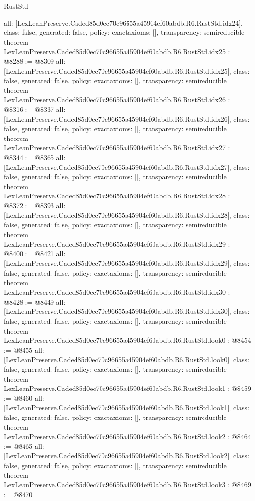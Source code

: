 \begin{lexlean}{RustStd}
\begin{coremodule}
{  all: [LexLeanPreserve.Caded85d0ec70c96655a45904ef60abdb.R6.RustStd.idx24],
  class: false,
  generated: false,
  policy: exact{axioms: []},
  transparency: semireducible
}
theorem LexLeanPreserve.Caded85d0ec70c96655a45904ef60abdb.R6.RustStd.idx25 : @8288 := @8309 {
  all: [LexLeanPreserve.Caded85d0ec70c96655a45904ef60abdb.R6.RustStd.idx25],
  class: false,
  generated: false,
  policy: exact{axioms: []},
  transparency: semireducible
}
theorem LexLeanPreserve.Caded85d0ec70c96655a45904ef60abdb.R6.RustStd.idx26 : @8316 := @8337 {
  all: [LexLeanPreserve.Caded85d0ec70c96655a45904ef60abdb.R6.RustStd.idx26],
  class: false,
  generated: false,
  policy: exact{axioms: []},
  transparency: semireducible
}
theorem LexLeanPreserve.Caded85d0ec70c96655a45904ef60abdb.R6.RustStd.idx27 : @8344 := @8365 {
  all: [LexLeanPreserve.Caded85d0ec70c96655a45904ef60abdb.R6.RustStd.idx27],
  class: false,
  generated: false,
  policy: exact{axioms: []},
  transparency: semireducible
}
theorem LexLeanPreserve.Caded85d0ec70c96655a45904ef60abdb.R6.RustStd.idx28 : @8372 := @8393 {
  all: [LexLeanPreserve.Caded85d0ec70c96655a45904ef60abdb.R6.RustStd.idx28],
  class: false,
  generated: false,
  policy: exact{axioms: []},
  transparency: semireducible
}
theorem LexLeanPreserve.Caded85d0ec70c96655a45904ef60abdb.R6.RustStd.idx29 : @8400 := @8421 {
  all: [LexLeanPreserve.Caded85d0ec70c96655a45904ef60abdb.R6.RustStd.idx29],
  class: false,
  generated: false,
  policy: exact{axioms: []},
  transparency: semireducible
}
theorem LexLeanPreserve.Caded85d0ec70c96655a45904ef60abdb.R6.RustStd.idx30 : @8428 := @8449 {
  all: [LexLeanPreserve.Caded85d0ec70c96655a45904ef60abdb.R6.RustStd.idx30],
  class: false,
  generated: false,
  policy: exact{axioms: []},
  transparency: semireducible
}
theorem LexLeanPreserve.Caded85d0ec70c96655a45904ef60abdb.R6.RustStd.look0 : @8454 := @8455 {
  all: [LexLeanPreserve.Caded85d0ec70c96655a45904ef60abdb.R6.RustStd.look0],
  class: false,
  generated: false,
  policy: exact{axioms: []},
  transparency: semireducible
}
theorem LexLeanPreserve.Caded85d0ec70c96655a45904ef60abdb.R6.RustStd.look1 : @8459 := @8460 {
  all: [LexLeanPreserve.Caded85d0ec70c96655a45904ef60abdb.R6.RustStd.look1],
  class: false,
  generated: false,
  policy: exact{axioms: []},
  transparency: semireducible
}
theorem LexLeanPreserve.Caded85d0ec70c96655a45904ef60abdb.R6.RustStd.look2 : @8464 := @8465 {
  all: [LexLeanPreserve.Caded85d0ec70c96655a45904ef60abdb.R6.RustStd.look2],
  class: false,
  generated: false,
  policy: exact{axioms: []},
  transparency: semireducible
}
theorem LexLeanPreserve.Caded85d0ec70c96655a45904ef60abdb.R6.RustStd.look3 : @8469 := @8470 {
}
\end{coremodule}
\end{lexlean}
